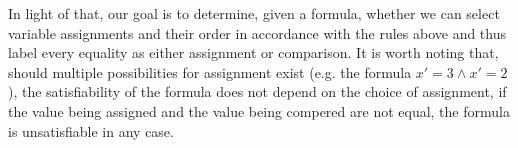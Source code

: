 \documentclass[a4paper, 12pt]{article}
\begin{document}
In light of that, our goal is to determine, given a formula, whether we can select variable assignments and their order in accordance with the rules above and thus label every equality as either assignment or comparison. It is worth noting that, should multiple possibilities for assignment exist (e.g. the formula $x' = 3 \wedge x' =2$), the satisfiability of the formula does not depend on the choice of assignment, if the value being assigned and the value being compered are not equal, the formula is unsatisfiable in any case.
\end{document}
